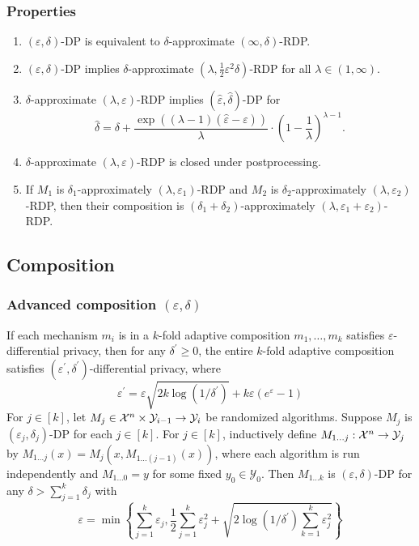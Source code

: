 \documentclass[10pt]{article}
\begin{document}
\subsubsection{Properties}
\begin{enumerate}
    \item $(\varepsilon, \delta)$-DP is equivalent to $\delta$-approximate $(\infty, \delta)$-RDP. 
    \item $(\varepsilon, \delta)$-DP implies $\delta$-approximate $(\lambda, \frac{1}{2} \varepsilon^2 \delta)$-RDP for all $\lambda \in (1, \infty)$. 
    \item $\delta$-approximate $(\lambda, \varepsilon)$-RDP implies $(\hat{\varepsilon}, \hat{\delta})$-DP for 
    \begin{equation}
        \hat{\delta} = \delta + \frac{\exp ( (\lambda-1)(\hat{\varepsilon}- \varepsilon))}{\lambda} \cdot \left( 1- \frac{1}{\lambda} \right)^{\lambda-1}. 
    \end{equation}
    \item $\delta$-approximate $(\lambda, \varepsilon)$-RDP is closed under postprocessing. 
    \item If $M_1$ is $\delta_1$-approximately $(\lambda, \varepsilon_1)$-RDP and $M_2$ is $\delta_2$-approximately $(\lambda, \varepsilon_2)$-RDP, then their composition is $(\delta_1 + \delta_2)$-approximately $(\lambda, \varepsilon_1 + \varepsilon_2)$-RDP. 
\end{enumerate}
\subsection{Composition}
\subsubsection[alternative]{Advanced composition $(\varepsilon, \delta)$}
 If each mechanism $m_i$ is in a $k$-fold adaptive composition $m_1, \dots, m_k$ satisfies $\varepsilon$-differential privacy, then for any $\delta^{\prime} \geq 0$, the entire $k$-fold adaptive composition satisfies $(\varepsilon^{\prime}, \delta^{\prime})$-differential privacy, where 
\begin{equation}
    \varepsilon^{\prime} = \varepsilon \sqrt{2k \log (1 / \delta^{\prime})} + k \varepsilon(e^{\varepsilon}-1) 
\end{equation}
 For $j \in [k]$, let $M_j \in \mathcal{X}^n \times \mathcal{Y}_{i-1} \to \mathcal{Y}_i$ be randomized algorithms. Suppose $M_j$ is $(\varepsilon_j , \delta_j)$-DP for each $j \in [k]$. For $j \in [k]$, inductively define $M_{1 \dots j}: \mathcal{X}^n \to \mathcal{Y}_j$ by $M_{1 \dots j} (x) = M_j(x, M_{1 \dots (j-1)} (x))$, where each algorithm is run independently and $M_{1 \dots 0} =y $ for some fixed $y_0 \in \mathcal{Y}_0$. Then $M_{1 \dots k}$ is $(\varepsilon, \delta)$-DP for any $\delta > \sum_{j=1}^k \delta_j$ with 
\begin{equation}
    \varepsilon = \min\left\{\sum_{j=1}^k \varepsilon_j , \frac{1}{2} \sum_{j=1}^k \varepsilon_j^2 + \sqrt{2 \log (1/ \delta^{\prime}) \sum_{k=1}^k \varepsilon_j^2}\right\}
\end{equation}
\end{document}
